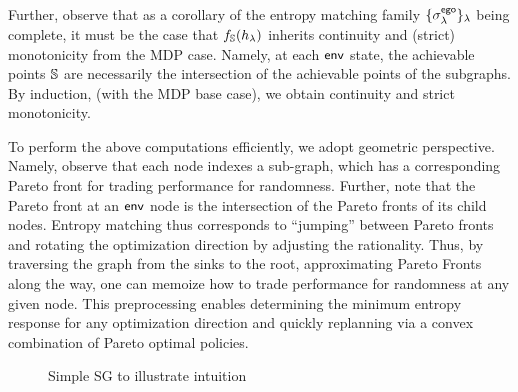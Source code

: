 Further, observe that as a corollary of the entropy matching family
$\{\sigma^{\mathsf{ego}}_\lambda\}_\lambda$ being complete, it must be the case that
$f_\mathbb{S}(h_\lambda)$ inherits continuity and (strict) monotonicity
from the MDP case. Namely, at each $\mathsf{env}$ state, the achievable
points $\mathbb{S}$ are necessarily the intersection of the achievable
points of the subgraphs. By induction, (with the MDP base case), we
obtain continuity and strict monotonicity.

To perform the above computations efficiently, we adopt geometric
perspective. Namely, observe that each node indexes a sub-graph, which
has a corresponding Pareto front for trading performance for
randomness. Further, note that the Pareto front at an $\mathsf{env}$ node is
the intersection of the Pareto fronts of its child nodes. Entropy
matching thus corresponds to ``jumping'' between Pareto fronts and
rotating the optimization direction by adjusting the rationality.
 Thus, by traversing the graph from the sinks to the
root, approximating Pareto Fronts along the way, one can memoize how
to trade performance for randomness at any given node. This
preprocessing enables determining the minimum entropy response for any
optimization direction and quickly replanning via a convex
combination of Pareto optimal policies.



\begin{figure}[h]
\centering
\scalebox{0.8}{

}
\caption{Simple SG to illustrate intuition}
\label{fig:sg:simplest}
\end{figure}

